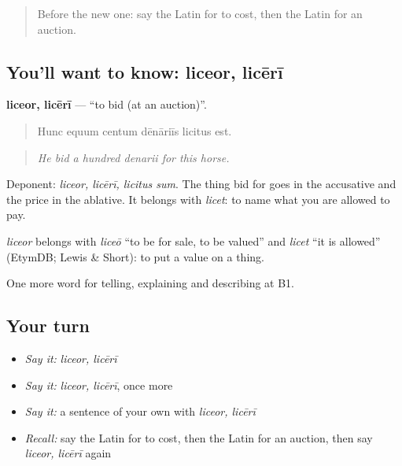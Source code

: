 \begin{quote}
Before the new one: say the Latin for to cost, then the Latin for an auction.
\end{quote}

\subsection*{You'll want to know: liceor, licērī}
\textbf{liceor, licērī} — \textquotedblleft{}to bid (at an auction)\textquotedblright{}.

\begin{quote}
Hunc equum centum dēnāriīs licitus est.
\end{quote}

\begin{quote}
\emph{He bid a hundred denarii for this horse.}
\end{quote}

Deponent: \emph{liceor, licērī, licitus sum}. The thing bid for goes in the accusative and the price in the ablative. It belongs with \emph{licet}: to name what you are allowed to pay.

\begin{cousinweb}
\emph{liceor} belongs with \emph{liceō} \textquotedblleft{}to be for sale, to be valued\textquotedblright{} and \emph{licet} \textquotedblleft{}it is allowed\textquotedblright{} (EtymDB; Lewis \& Short): to put a value on a thing.
\end{cousinweb}

\begin{grammarlens}[title={What you've built}]
One more word for telling, explaining and describing at B1.
\end{grammarlens}

\subsection*{Your turn}
\begin{itemize}
\raggedright
  \item \emph{Say it:} \emph{liceor, licērī}
  \item \emph{Say it:} \emph{liceor, licērī}, once more
  \item \emph{Say it:} a sentence of your own with \emph{liceor, licērī}
  \item \emph{Recall:} say the Latin for to cost, then the Latin for an auction, then say \emph{liceor, licērī} again
\end{itemize}

